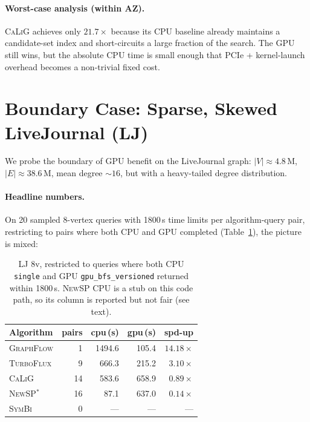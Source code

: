 \documentclass[sigconf,nonacm]{acmart}
\theoremstyle{definition}
\begin{document}
\paragraph{Worst-case analysis (within AZ).}
\textsc{CaLiG} achieves only $21.7\times$ because its CPU baseline already maintains a candidate-set index and short-circuits a large fraction of the search. The GPU still wins, but the absolute CPU time is small enough that PCIe + kernel-launch overhead becomes a non-trivial fixed cost.

\section{Boundary Case: Sparse, Skewed LiveJournal (LJ)}
\label{sec:lj}

We probe the boundary of GPU benefit on the LiveJournal graph: $|V|\approx 4.8$\,M, $|E|\approx 38.6$\,M, mean degree $\sim 16$, but with a heavy-tailed degree distribution.

\paragraph{Headline numbers.} On 20 sampled 8-vertex queries with 1800\,s time limits per algorithm-query pair, restricting to pairs where both CPU and GPU completed (Table~\ref{tab:lj}), the picture is mixed:

\begin{table}[t]
  \centering
  \small
  \caption{LJ 8v, restricted to queries where both CPU \texttt{single} and GPU \texttt{gpu\_bfs\_versioned} returned within 1800\,s. \textsc{NewSP} CPU is a stub on this code path, so its column is reported but not fair (see text).}
  \label{tab:lj}
  \begin{tabular}{lrrrr}
    \toprule
    \textbf{Algorithm} & \textbf{pairs} & \textbf{cpu\,(s)} & \textbf{gpu\,(s)} & \textbf{spd-up} \\
    \midrule
    \textsc{GraphFlow} &  1 & 1494.6 &  105.4 & $14.18\times$ \\
    \textsc{TurboFlux} &  9 &  666.3 &  215.2 & $3.10\times$  \\
    \textsc{CaLiG}     & 14 &  583.6 &  658.9 & $0.89\times$  \\
    \textsc{NewSP$^*$} & 16 &   87.1 &  637.0 & $0.14\times$  \\
    \textsc{SymBi}     &  0 & ---    & ---    & ---           \\
    \bottomrule
  \end{tabular}
\end{table}
\end{document}
